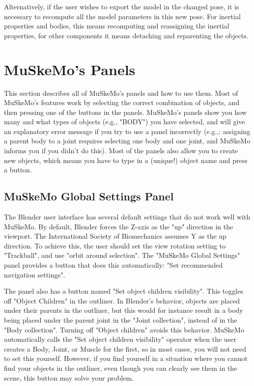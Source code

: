 \documentclass{article}
\begin{document}
Alternatively, if the user wishes to export the model in the changed pose, it is necessary to recompute all the model parameters in this new pose. For inertial properties and bodies, this means recomputing and reassigning the inertial properties, for other components it means detaching and reparenting the objects.


\section{MuSkeMo's Panels}
This section describes all of MuSkeMo's panels and how to use them. Most of MuSkeMo's features work by selecting the correct combination of objects, and then pressing one of the buttons in the panels. MuSkeMo's panels show you how many and what types of objects (e.g., "BODY") you have selected, and will give an explanatory error message if you try to use a panel incorrectly (e.g.,: assigning a parent body to a joint requires selecting one body and one joint, and MuSkeMo informs you if you didn't do this). Most of the panels also allow you to create new objects, which means you have to type in a (unique!) object name and press a button. 

\subsection{MuSkeMo Global Settings Panel}
\label{sec:MSM_glob_settings}
The Blender user interface has several default settings that do not work well with MuSkeMo. By default, Blender forces the Z-axis as the "up" direction in the viewport. The International Society of Biomechanics assumes Y as the up direction. To achieve this, the user should set the view rotation setting to "Trackball", and use "orbit around selection". The "MuSkeMo Global Settings" panel provides a button that does this automatically: "Set recommended navigation settings". 

The panel also has a button named "Set object children visibility". This toggles off "Object Children" in the outliner. In Blender's behavior, objects are placed under their parents in the outliner, but this would for instance result in a body being placed under the parent joint in the "Joint collection", instead of in the "Body collection". Turning off "Object children" avoids this behavior. MuSkeMo automatically calls the "Set object children visibility" operator when the user creates a Body, Joint, or Muscle for the first, so in most cases, you will not need to set this yourself. However, if you find yourself in a situation where you cannot find your objects in the outliner, even though you can clearly see them in the scene, this button may solve your problem.
\end{document}

